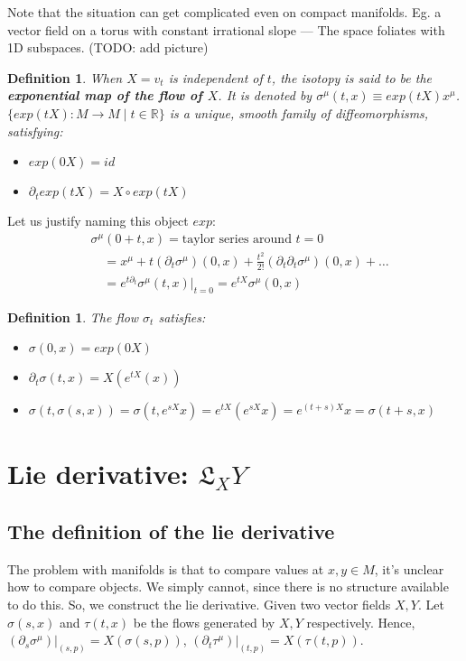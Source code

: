 \documentclass[11pt]{book}
\newcommand{\R}{\ensuremath{\mathbb R}}
\newcommand{\Lie}{\ensuremath{\mathfrak{L}}}
\newtheorem{definition}[theorem]{Definition}
\begin{document}
Note that the situation can get complicated even on compact manifolds. Eg. a
vector field on a torus with constant irrational slope --- The space foliates
with 1D subspaces. (TODO: add picture)


\begin{definition}
    When $X = v_t$ is independent of $t$, the isotopy is said to be the
    \textbf{exponential map of the flow of $X$}. It is denoted by
    $\sigma^\mu(t, x) \equiv exp(tX) x^\mu$.
    $\{ exp(tX): M \rightarrow M \mid t \in \R \}$ is a unique,
    smooth family of diffeomorphisms, satisfying:
    \begin{itemize}
        \item $exp(0X) = id$
        \item $\partial_t exp(tX) = X \circ exp(tX)$
    \end{itemize}
\end{definition}

Let us justify naming this object $exp$:
\begin{align*}
    &\sigma^\mu(0 + t, x) = \text{taylor series around $t = 0$} \\
    &\quad = x^\mu + t (\partial_t \sigma^\mu)(0, x) + \frac{t^2}{2!} (\partial_t \partial_t \sigma^\mu)(0, x) + \dots \\
    &\quad = e^{t \partial_t} \sigma^\mu(t, x) |_{t=0} = e^{t X} \sigma^\mu(0, x)
\end{align*}

\begin{definition}
    The flow $\sigma_t$ satisfies:
    \begin{itemize}
        \item $\sigma(0, x) = exp(0X)$
        \item $\partial_t \sigma(t, x) = X(e^{tX}(x))$
        \item $\sigma(t, \sigma(s, x)) = \sigma(t, e^{sX} x) = e^{tX} (e^{sX} x) = e^{(t+s)X} x = \sigma(t + s, x)$
    \end{itemize}
\end{definition}

\chapter{Lie derivative: $\Lie_X Y$}
\section{The definition of the lie derivative}
The problem with manifolds is that to compare values at $x, y \in M$, it's
unclear how to compare objects. We simply cannot, since there is no structure
available to do this. So, we construct the lie derivative. Given two vector
fields $X, Y$. Let $\sigma(s, x)$ and $\tau(t, x)$ be the flows generated
by $X, Y$ respectively. Hence, $(\partial_s \sigma^\mu)|_{(s, p)} = X(\sigma(s, p))$,
$(\partial_t \tau^\mu)|_{(t, p)} = X(\tau(t, p))$.
\end{document}
